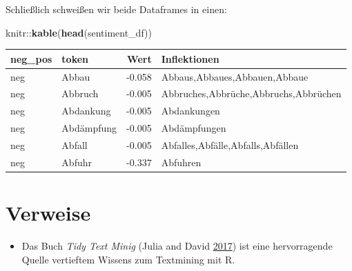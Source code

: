 \documentclass[12pt,]{book}
\newenvironment{Shaded}{\begin{snugshade}}{\end{snugshade}}
\newcommand{\KeywordTok}[1]{\textcolor[rgb]{0.13,0.29,0.53}{\textbf{{#1}}}}
\newcommand{\DataTypeTok}[1]{\textcolor[rgb]{0.13,0.29,0.53}{{#1}}}
\newcommand{\StringTok}[1]{\textcolor[rgb]{0.31,0.60,0.02}{{#1}}}
\newcommand{\NormalTok}[1]{{#1}}
\providecommand{\tightlist}{%
  \setlength{\itemsep}{0pt}\setlength{\parskip}{0pt}}
\begin{document}
Schließlich schweißen wir beide Dataframes in einen:

\begin{Shaded}
\end{Shaded}

\begin{Shaded}
\begin{Highlighting}[]
\NormalTok{knitr::}\KeywordTok{kable}\NormalTok{(}\KeywordTok{head}\NormalTok{(sentiment_df))}
\end{Highlighting}
\end{Shaded}

\begin{tabular}{l|l|r|l}
\hline
neg\_pos & token & Wert & Inflektionen\\
\hline
neg & Abbau & -0.058 & Abbaus,Abbaues,Abbauen,Abbaue\\
\hline
neg & Abbruch & -0.005 & Abbruches,Abbrüche,Abbruchs,Abbrüchen\\
\hline
neg & Abdankung & -0.005 & Abdankungen\\
\hline
neg & Abdämpfung & -0.005 & Abdämpfungen\\
\hline
neg & Abfall & -0.005 & Abfalles,Abfälle,Abfalls,Abfällen\\
\hline
neg & Abfuhr & -0.337 & Abfuhren\\
\hline
\end{tabular}

\section{Verweise}\label{verweise-5}

\begin{itemize}
\tightlist
\item
  Das Buch \emph{Tidy Text Minig} (Julia and David
  \protect\hyperlink{ref-tidytextminig}{2017}) ist eine hervorragende
  Quelle vertieftem Wissens zum Textmining mit R.
\end{itemize}
\end{document}
